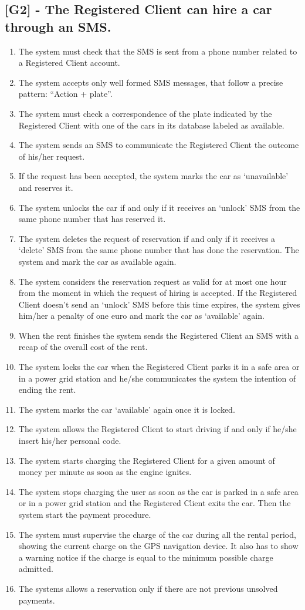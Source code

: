 \subsection{[G2] - The Registered Client can hire a car through an SMS.}
\begin{enumerate}[label=\textbf{R2.\arabic*)}]
\item The system must check that the SMS is sent from a phone number related to a Registered Client account.
\item The system accepts only well formed SMS messages, that follow a precise pattern: “Action + plate”.
\item The system must check a correspondence of the plate indicated by the Registered Client with one of the cars in its database labeled as available.
\item The system sends an SMS to communicate the Registered Client the outcome of his/her request.
\item If the request has been accepted, the system marks the car as ‘unavailable’ and reserves it.
\item The system unlocks the car if and only if it receives an ‘unlock’ SMS from  the same phone number that has reserved it.
\item The system deletes the request of reservation if and only if it receives a ‘delete’ SMS from the same phone number that has done the reservation. The system and mark the car as available again.
\item The system considers the reservation request as valid for at most one hour from the moment in which the request of hiring is accepted. If the Registered Client doesn’t send an ‘unlock’ SMS before this time expires, the system gives him/her a penalty of one euro and mark the car as ‘available’ again.
\item When the rent finishes the system sends the Registered Client an SMS with a recap of the overall cost of the rent.
\item The system locks the car when the Registered Client parks it in a safe area or in a power grid station and he/she communicates the system the intention of ending the rent.
\item The system marks the car ‘available’ again once it is locked.
\item The system allows the Registered Client to start driving if and only if he/she insert his/her personal code.
\item The system starts charging the Registered Client for a given amount of money per minute as soon as the engine ignites.
\item The system stops charging the user as soon as the car is parked in a safe area or in a power grid station and the Registered Client exits the car. Then the system start the payment procedure.
\item The system must supervise the charge of the car during all the rental period, showing the current charge on the GPS navigation device. It also has to show a warning notice if the charge is equal to the minimum possible charge admitted.
\item The systems allows a reservation only if there are not previous unsolved payments.
\end{enumerate}


